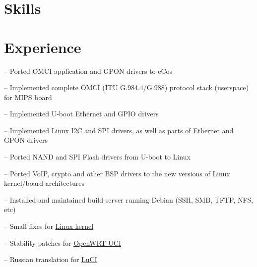 \documentclass{cv}
\begin{document}
\section{Skills}
\begin{sklist}
\end{sklist}
\section{Experience}
\begin{joblist}
{
  \par -- Ported OMCI application and GPON drivers to eCos
}
{
  \par -- Implemented complete OMCI (ITU G.984.4/G.988) protocol stack (userspace) for MIPS board
  \par -- Implemented U-boot Ethernet and GPIO drivers
  \par -- Implemented Linux I2C and SPI drivers, as well as parts of Ethernet and GPON drivers
  \par -- Ported NAND and SPI Flash drivers from U-boot to Linux
  \par -- Ported VoIP, crypto and other BSP drivers to the new versions of Linux kernel/board architectures
  \par -- Installed and maintained build server running Debian (SSH, SMB, TFTP, NFS, etc)
}
{
  \par -- Small fixes for \href{http://git.kernel.org/?p=linux\%2Fkernel\%2Fgit\%2Ftorvalds\%2Flinux.git\&a=search\&h=HEAD\&st=commit\&s=Stanislav+Fomichev}{Linux kernel}
  \par -- Stability patches for \href{http://nbd.name/gitweb.cgi?p=uci.git\&a=search\&h=HEAD\&st=commit\&s=Stanislav+Fomichev}{OpenWRT UCI}
  \par -- Russian translation for \href{http://i18n.luci.subsignal.org/pootle/ru/}{LuCI}
}
\end{joblist}
\end{document}
